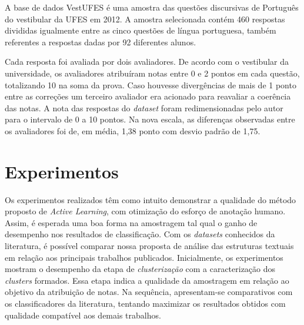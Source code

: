 A base de dados VestUFES \cite{pissinati2014} é uma amostra das questões discursivas de Português do vestibular da UFES em 2012. A amostra selecionada contém 460 respostas divididas igualmente entre as cinco questões de língua portuguesa, também referentes a respostas dadas por 92 diferentes alunos.

Cada resposta foi avaliada por dois avaliadores. De acordo com o vestibular da universidade, os avaliadores atribuíram notas entre 0 e 2 pontos em cada questão, totalizando 10 na soma da prova. Caso houvesse divergências de mais de 1 ponto entre as correções um terceiro avaliador era acionado para reavaliar a coerência das notas. A nota das respostas do \textit{dataset} foram redimensionadas pelo autor para o intervalo de 0 a 10 pontos. Na nova escala, as diferenças observadas entre os avaliadores foi de, em média, 1,38 ponto com desvio padrão de 1,75.

\section{Experimentos}
\label{sec-experimentos}

Os experimentos realizados têm como intuito demonstrar a qualidade do método proposto de \textit{Active Learning}, com otimização do esforço de anotação humano. Assim, é esperada uma boa forma na amostragem tal qual o ganho de desempenho nos resultados de classificação. Com os \textit{datasets} conhecidos da literatura, é possível comparar nossa proposta de análise das estruturas textuais em relação aos principais trabalhos publicados. Inicialmente, os experimentos mostram o desempenho da etapa de \textit{clusterização} com a caracterização dos \textit{clusters} formados. Essa etapa indica a qualidade da amostragem em relação ao objetivo da atribuição de notas. Na sequência, apresentam-se comparativos com os classificadores da literatura, tentando maximizar os resultados obtidos com qualidade compatível aos demais trabalhos.


